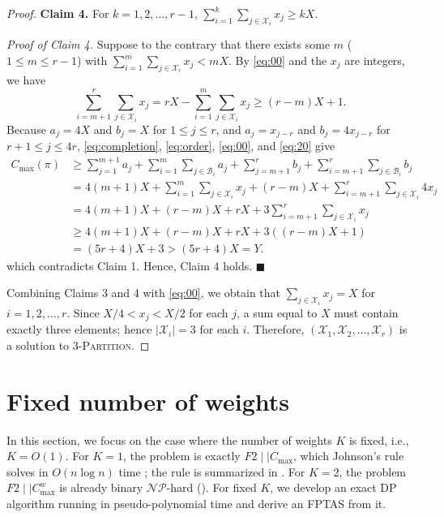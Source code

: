\documentclass[12pt]{article}
\let\origsection\section
\renewcommand{\section}{\FloatBarrier\origsection}
\begin{document}
\begin{sloppypar}
\begin{proof}
            \textbf{Claim 4.} For $k=1, 2, \ldots, r-1$, $\sum_{i=1}^k \sum_{j \in \mathcal{X}_i} x_j \geq kX$. 
            
            \textit{Proof of Claim 4.} Suppose to the contrary that there exists some $m$ ($1 \leq m \leq r-1$) with $\sum_{i=1}^m \sum_{j \in \mathcal{X}_i} x_j < mX$. By \cref{eq:00} and the $x_j$ are integers, we have
            \begin{equation}\label{eq:20}
                \sum_{i=m+1}^r \sum_{j \in \mathcal{X}_i} x_j=rX-\sum_{i=1}^m \sum_{j \in \mathcal{X}_i} x_j \geq (r-m)X+1. 
            \end{equation}
            Because $a_j=4X$ and $b_j=X$ for $1 \leq j \leq r$, and $a_j=x_{j-r}$ and $b_j=4 x_{j-r}$ for $r+1 \leq j \leq 4r$, \cref{eq:completion}, \cref{eq:order}, \cref{eq:00}, and \cref{eq:20} give 
            \begin{align*}
                C_{\max}(\pi) & \geq \sum_{j=1}^{m+1} a_j+\sum_{i=1}^m \sum_{j \in \mathcal{B}_i} a_j+\sum_{j=m+1}^r      b_j+\sum_{i=m+1}^r \sum_{j \in \mathcal{B}_i} b_j  \nonumber \\ 
                &= 4(m+1)X+\sum_{i=1}^m \sum_{j \in \mathcal{X}_i} x_j +(r-m)X +\sum_{i=m+1}^r \sum_{j \in \mathcal{X}_i} 4 x_j \nonumber \\
                &= 4(m+1)X +(r-m)X + rX+ 3 \sum_{i=m+1}^r \sum_{j \in \mathcal{X}_i} x_j \\
                & \geq 4(m+1)X +(r-m)X + rX+ 3((r-m)X+1)  \nonumber \\
                & = (5r+4)X +3 > (5r+4)X = Y. \nonumber
            \end{align*} 
            which contradicts Claim 1. Hence, Claim 4 holds. \hfill$\blacksquare$
            
            Combining Claims 3 and 4 with \cref{eq:00}, we obtain that $\sum_{j \in \mathcal{X}_i} x_j=X$ for $i=1, 2, \ldots, r$. Since $X/4 < x_j < X/2$ for each $j$, a sum equal to $X$ must contain exactly three elements; hence  $|\mathcal{X}_i|=3$ for each $i$. Therefore, $(\mathcal{X}_1, \mathcal{X}_2, \ldots, \mathcal{X}_r)$ is a solution to 3-\textsc{Partition}.
        \end{proof}
        
        \section{Fixed number of weights}  \label{sec:dp_algorithm}
        
        In this section, we focus on the case where the number of weights $K$ is fixed, i.e., $K=O(1)$. For $K=1$, the problem is exactly $F2 \mid \mid C_{\max}$, which Johnson's rule solves in $O(n \log n)$ time \citep{Johnson1954NRL}; the rule is summarized in . For $K=2$, the problem $F2 \mid \mid C_{\max}^w$ is already binary $\mathcal{NP}$-hard (). For fixed $K$, we develop an exact DP algorithm running in pseudo-polynomial time and derive an FPTAS from it. 
        

\end{sloppypar}
\end{document}
